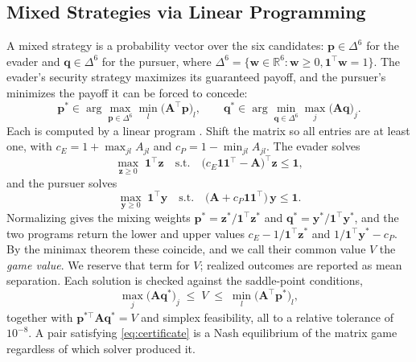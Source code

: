 \documentclass[letterpaper, 10 pt, conference]{ieeeconf}  %
\begin{document}

\subsection{Mixed Strategies via Linear Programming}

A mixed strategy is a probability vector over the six candidates: $\mathbf{p} \in \Delta^6$ for the evader and $\mathbf{q} \in \Delta^6$ for the pursuer, where $\Delta^6 = \{\mathbf{w} \in \mathbb{R}^6 : \mathbf{w} \geq 0, \mathbf{1}^\top \mathbf{w} = 1\}$. The evader's security strategy maximizes its guaranteed payoff, and the pursuer's minimizes the payoff it can be forced to concede:
%
\begin{equation}
    \mathbf{p}^* \in \arg\max_{\mathbf{p} \in \Delta^6} \min_{l} \big(\mathbf{A}^\top \mathbf{p}\big)_l, \qquad
    \mathbf{q}^* \in \arg\min_{\mathbf{q} \in \Delta^6} \max_{j} \big(\mathbf{A} \mathbf{q}\big)_j .
    \label{eq:security}
\end{equation}
%
Each is computed by a linear program \cite{bacsar1998dynamic}. Shift the matrix so all entries are at least one, with $c_E = 1 + \max_{jl} A_{jl}$ and $c_P = 1 - \min_{jl} A_{jl}$. The evader solves
%
\begin{equation}
    \max_{\mathbf{z} \geq 0} \; \mathbf{1}^\top \mathbf{z} \quad \text{s.t.} \quad \big(c_E \mathbf{1}\mathbf{1}^\top - \mathbf{A}\big)^\top \mathbf{z} \leq \mathbf{1},
    \label{eq:game_LP}
\end{equation}
%
and the pursuer solves
%
\begin{equation}
    \max_{\mathbf{y} \geq 0} \; \mathbf{1}^\top \mathbf{y} \quad \text{s.t.} \quad \big(\mathbf{A} + c_P \mathbf{1}\mathbf{1}^\top\big)\, \mathbf{y} \leq \mathbf{1} .
    \label{eq:game_LP_P}
\end{equation}
%
Normalizing gives the mixing weights $\mathbf{p}^* = \mathbf{z}^*/\mathbf{1}^\top\mathbf{z}^*$ and $\mathbf{q}^* = \mathbf{y}^*/\mathbf{1}^\top\mathbf{y}^*$, and the two programs return the lower and upper values $c_E - 1/\mathbf{1}^\top\mathbf{z}^*$ and $1/\mathbf{1}^\top\mathbf{y}^* - c_P$. By the minimax theorem these coincide, and we call their common value $V$ the \emph{game value}. We reserve that term for $V$; realized outcomes are reported as mean separation. Each solution is checked against the saddle-point conditions,
%
\begin{equation}
    \max_j \big(\mathbf{A}\mathbf{q}^*\big)_j \;\leq\; V \;\leq\; \min_l \big(\mathbf{A}^\top \mathbf{p}^*\big)_l ,
    \label{eq:certificate}
\end{equation}
%
together with $\mathbf{p}^{*\top}\mathbf{A}\mathbf{q}^* = V$ and simplex feasibility, all to a relative tolerance of $10^{-8}$. A pair satisfying \eqref{eq:certificate} is a Nash equilibrium of the matrix game regardless of which solver produced it.
\end{document}
